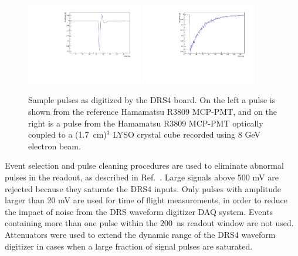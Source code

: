\begin{figure}[h] \centering
\includegraphics[width=0.45\textwidth]{figs/timing/RefPulse} 
\includegraphics[width=0.45\textwidth]{figs/timing/run064_event506} 
\caption{ Sample pulses as digitized by the DRS4 board. 
On the left a pulse is shown from the reference Hamamatsu R3809 MCP-PMT, 
and on the right is a pulse from the Hamamatsu R3809 MCP-PMT
optically coupled to a (1.7~cm)$^{3}$ LYSO crystal cube
recorded using  8 GeV electron beam.} 
\label{fig:PulseShapes}
\end{figure}

Event selection and pulse cleaning procedures are used to eliminate abnormal
pulses in the readout, as described in Ref.~\cite{MCPFastCaloNIMA}. Large signals
above 500 mV are rejected because they saturate the DRS4 inputs. Only pulses
with amplitude larger than 20 mV are used for time of flight measurements, in
order to reduce the impact of noise from the DRS waveform digitizer DAQ system.
Events containing more than one pulse within the $200$~ns readout window are not
used. Attenuators were used to extend the dynamic range of the DRS4
waveform digitizer in cases when a large fraction of signal pulses are saturated.

